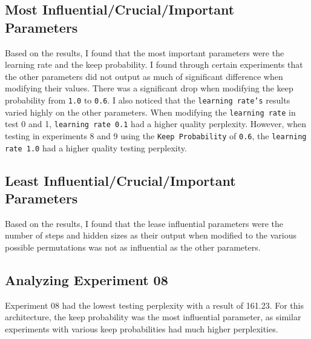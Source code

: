 \documentclass[a4paper]{article}
\begin{document}
\subsection{Most Influential/Crucial/Important Parameters}
Based on the results, I found that the most important parameters were the learning rate and the keep probability. I found through certain experiments that the other parameters did not output as much of significant difference when modifying their values. There was a significant drop when modifying the keep probability from \texttt{1.0} to \texttt{0.6}. I also noticed that the \texttt{learning rate's} results varied highly on the other parameters. When modifying the \texttt{learning rate} in test 0 and 1, \texttt{learning rate 0.1} had a higher quality perplexity. However, when testing in experiments 8 and 9 using the \texttt{Keep Probability} of \texttt{0.6}, the \texttt{learning rate 1.0} had a higher quality testing perplexity.

\subsection{Least Influential/Crucial/Important Parameters}
Based on the results, I found that the lease influential parameters were the number of steps and hidden sizes as their output when modified to the various possible permutations was not as influential as the other parameters.

\subsection{Analyzing Experiment 08}
Experiment 08 had the lowest testing perplexity with a result of 161.23. For this architecture, the keep probability was the most influential parameter, as similar experiments with various keep probabilities had much higher perplexities.
\end{document}
